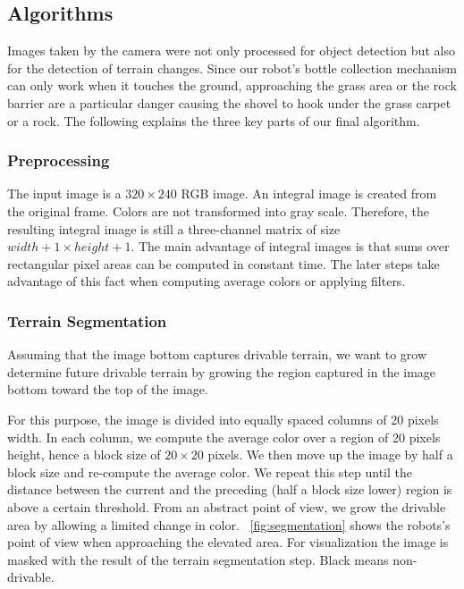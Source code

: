 \subsection{Algorithms}
Images taken by the camera were not only processed for object detection but also for 
the detection of terrain changes. Since our robot's bottle collection mechanism can only
work when it touches the ground, approaching the grass area or the rock barrier are
a particular danger causing the shovel to hook under the grass carpet or a rock.
The following explains the three key parts of our final algorithm.

\subsubsection{Preprocessing}
The input image is a $320 \times 240$ RGB image. 
An integral image is created from the original frame. Colors are not transformed into
gray scale. Therefore, the resulting integral image is still a three-channel matrix
of size $width + 1 \times height + 1$. The main advantage of integral images is 
that sums over rectangular pixel areas can be computed in constant time. The later
steps take advantage of this fact when computing average colors or applying filters.

\subsubsection{Terrain Segmentation}
Assuming that the image bottom captures drivable terrain, we want to grow determine 
future drivable terrain by growing the region captured in the image bottom toward
the top of the image.

For this purpose, the image is divided into equally spaced columns of 20 pixels width.
In each column, we compute the average color over a region of 20 pixels height, hence 
a block size of $20 \times 20$ pixels. We then move up the image by half a block size
and re-compute the average color. We repeat this step until the distance between the
current and the preceding (half a block size lower) region is above a certain 
threshold. From an abstract point of view, we grow the drivable area by allowing a 
limited change in color. \figurename~\ref{fig:segmentation} shows the robots's point
of view when approaching the elevated area. For visualization the image is masked
with the result of the terrain segmentation step. Black means non-drivable.


